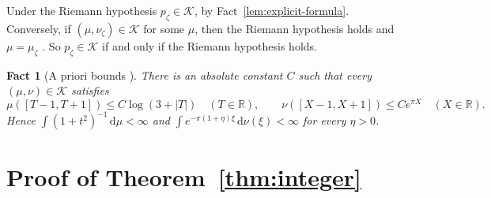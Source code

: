 \documentclass[11pt]{amsart}
\newcommand{\RR}{\mathbb R}
\newcommand{\dd}{\,\mathrm d}
\newcommand{\muz}{\mu_\zeta}
\newcommand{\nuz}{\nu_\zeta}
\newcommand{\pz}{p_\zeta}
\newcommand{\Kad}{\mathcal K}
\newtheorem{fact}[theorem]{Fact}
\theoremstyle{definition}
\theoremstyle{remark}
\numberwithin{equation}{section}
\begin{document}
Under the Riemann hypothesis $\pz\in\Kad$, by Fact~\ref{lem:explicit-formula}. Conversely, if $(\mu,\nuz)\in\Kad$ for some $\mu$, then
the Riemann hypothesis holds and $\mu=\muz$ \cite[Theorem~2.9(b)]{PaperI}. So $\pz\in\Kad$ if and only if the Riemann hypothesis holds.

\begin{fact}[A priori bounds {\cite{PaperI}}]\label{lem:apriori}
There is an absolute constant $C$ such that every $(\mu,\nu)\in\Kad$ satisfies
\[
\mu([T-1,T+1])\le C\log(3+\lvert T\rvert)\quad(T\in\RR),\qquad \nu([X-1,X+1])\le Ce^{\pi X}\quad(X\in\RR).
\]
Hence $\int(1+t^2)^{-1}\dd\mu<\infty$ and $\int e^{-\pi(1+\eta)\xi}\dd\nu(\xi)<\infty$ for every $\eta>0$.
\end{fact}

\section{Proof of Theorem~\ref{thm:integer}}\label{sec:proof}
\end{document}
